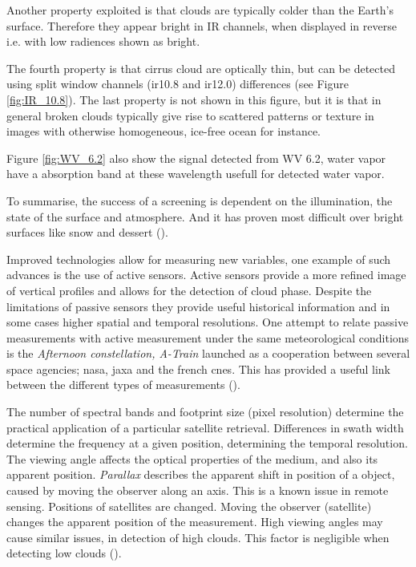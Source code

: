 Another property exploited is that clouds are typically colder than the Earth's surface. Therefore they appear bright in IR channels, when displayed in reverse i.e. with low radiences shown as bright. 

The fourth property is that cirrus cloud are optically thin, but can be detected using split window channels (\acrshort{ir}10.8 and \acrshort{ir}12.0) differences (see Figure \ref{fig:IR_10.8}). The last property is not shown in this figure, but it is that in general broken clouds typically give rise to scattered patterns or texture in images with otherwise homogeneous, ice-free ocean for instance. 

Figure \ref{fig:WV_6.2} also show the signal detected from WV 6.2, water  vapor have a absorption band at these wavelength usefull for detected water vapor. 

To summarise, the success of a screening is dependent on the illumination, the state of the surface and atmosphere. And it has proven most difficult over bright surfaces like snow and dessert (\cite{Karlsson2015AdvancingData}). 

Improved technologies allow for measuring new variables, one example of such advances is the use of active sensors. Active sensors provide a more refined image of vertical profiles and allows for the detection of cloud phase. Despite the limitations of passive sensors they provide useful historical information and in some cases higher spatial and temporal resolutions. One attempt to relate passive measurements with active measurement under the same meteorological conditions is the \textit{Afternoon constellation, A-Train} launched as a cooperation between several space agencies; \acrfull{nasa}, \acrlong{jaxa} and the french \acrfull{cnes}. This has provided a useful link between the different types of measurements (\cite{Stephens2018CloudsatSystem}). 

The number of spectral bands and footprint size (pixel resolution) determine the practical application of a particular satellite retrieval. Differences in swath width determine the frequency at a given position, determining the temporal resolution. The viewing angle affects the optical properties of the medium, and also its apparent position. \textit{Parallax} describes the apparent shift in position of a object, caused by moving the observer along an axis. This is a known issue in remote sensing. Positions of satellites are changed. Moving the observer (satellite) changes the apparent position of the measurement. 
High viewing angles may cause similar issues, in detection of high clouds. This factor is negligible when detecting low clouds (\cite{Joro2010ComparisonFinland}). 

